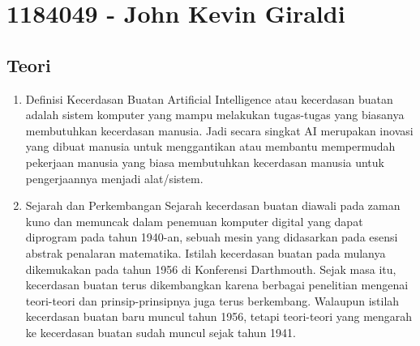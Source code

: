 \section{1184049 - John Kevin Giraldi}
\subsection{Teori}
\begin{enumerate}

	\item Definisi Kecerdasan Buatan
	\hfill\break
Artificial Intelligence atau kecerdasan buatan adalah sistem komputer yang mampu melakukan tugas-tugas yang biasanya membutuhkan kecerdasan manusia. Jadi secara singkat AI merupakan inovasi yang dibuat manusia untuk menggantikan atau membantu mempermudah pekerjaan manusia yang biasa membutuhkan kecerdasan manusia untuk pengerjaannya menjadi alat/sistem.

	\item Sejarah dan Perkembangan
	\hfill\break
Sejarah kecerdasan buatan diawali pada zaman kuno dan memuncak dalam penemuan komputer digital yang dapat diprogram pada tahun 1940-an, sebuah mesin yang didasarkan pada esensi abstrak penalaran matematika. 
Istilah kecerdasan buatan pada mulanya dikemukakan pada tahun 1956 di Konferensi Darthmouth. Sejak masa itu, kecerdasan buatan terus dikembangkan karena berbagai penelitian mengenai teori-teori dan prinsip-prinsipnya juga terus berkembang. Walaupun istilah kecerdasan buatan baru muncul tahun 1956, tetapi teori-teori yang mengarah ke kecerdasan buatan sudah muncul sejak tahun 1941.
	


\end{enumerate}
